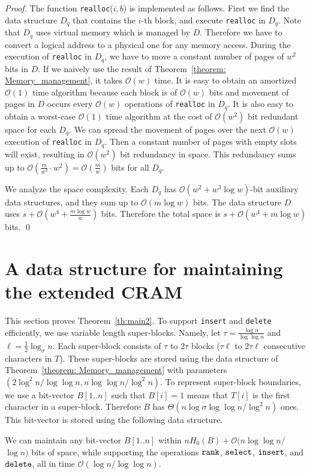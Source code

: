 \documentclass{llncs}
\newcommand{\Order}{\mathcal{O}}
\begin{document}
\begin{proof}
The function \texttt{realloc}($i,b$) is implemented as follows.
First we find the data structure $D_q$ that contains the $i$-th block,
and execute \texttt{realloc} in $D_q$.  Note that $D_q$ uses virtual memory
which is managed by $D$.  Therefore we have to convert a logical address to
a physical one for any memory access.
During the execution of \texttt{realloc} in $D_q$, we have to move a constant
number of pages of $w^2$ bits in $D$.
If we naively use the result of Theorem~\ref{theorem: Memory_management},
it takes $\Order(w)$ time.  It is easy to obtain an amortized $\Order(1)$ time
algorithm because each block is of $\Order(w)$ bits and movement of pages in $D$
occurs every $\Order(w)$ operations of \texttt{realloc} in $D_q$.
It is also easy to obtain a worst-case $\Order(1)$ time algorithm at the cost
of $\Order(w^2)$ bit redundant space for each $D_q$.  We can spread the movement
of pages over the next $\Order(w)$ execution of \texttt{realloc} in $D_q$.
Then a constant number of pages with empty slots will exist, resulting in $\Order(w^2)$
bit redundancy in space.  This redundancy sums up to 
$\Order(\frac{m}{w^3}\cdot w^2) = \Order(\frac{m}{w})$ bits for all $D_q$.

We analyze the space complexity.  Each $D_q$ has $\Order(w^2 + w^3 \log w)$-bit
auxiliary data structures, and they sum up to $\Order(m \log w)$ bits.
The data structure $D$ uses $s + \Order(w^4 + \frac{m \log w}{w})$ bits.
Therefore the total space is $s + \Order(w^4 + m \log w)$ bits.
\qed
\end{proof}




\section{A data structure for maintaining the extended CRAM}
\label{sec:indel}

This section proves Theorem~\ref{th:main2}.
To support \texttt{insert} and \texttt{delete} efficiently,
we use variable length super-blocks.  
Namely, let $\tau = \frac{\log n}{\log \log n}$ and $\ell = \frac{1}{2}\log_{\sigma} n$.
Each super-block consists of $\tau$ to $2\tau$ blocks
($\tau\ell$ to $2\tau\ell$ consecutive characters in $T$).
These super-blocks are stored using the data structure of Theorem~\ref{theorem: Memory_management} with parameters $(2\log^2 n/\log\log n, n\log\log n/\log^2 n)$.
To represent super-block boundaries, we use a bit-vector $B[1..n]$
such that $B[i]=1$ means that $T[i]$ is the first character in a super-block.
Therefore $B$ has $\Theta(n \log\sigma \log\log n/\log^2 n)$ ones.  
This bit-vector is stored using the following data structure.
\begin{lemma}\label{lem2:GS}
We can maintain any bit-vector $B[1..n]$ within $nH_0(B)+\Order(n \log \log n/$ $\log n)$ bits of space,
while supporting the operations $\textnormal{\texttt{rank}}$, $\textnormal{\texttt{select}}$,
 $\textnormal{\texttt{insert}}$, and $\textnormal{\texttt{delete}}$,
all in time $\Order(\log n/\log \log n)$.
\end{lemma}
\end{document}
